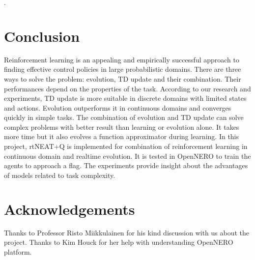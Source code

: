 \documentclass[letterpaper]{article}
\begin{document}
. 

\section{Conclusion}
Reinforcement learning is an appealing and empirically successful approach to finding effective
control policies in large probabilistic domains. There are three ways to solve the problem: evolution, TD update and their combination. Their performances depend on the properties of the task. According to our research and experiments, TD update is more suitable in discrete domains with limited states and actions. Evolution outperforms it in continuous domains and converges quickly in simple tasks. The combination of evolution and TD update can solve complex problems with better result than learning or evolution alone. It takes more time but it also evolves a function approximator during learning. In this project, rtNEAT+Q is implemented for combination of reinforcement learning in continuous domain and realtime evolution. It is tested in OpenNERO to train the agents to approach a flag. The experiments provide insight about the advantages of models related to task complexity.

\section*{Acknowledgements}
Thanks to Professor Risto Miikkulainen for his kind discussion with us about the project. Thanks to Kim Houck for her help with understanding OpenNERO platform.



\end{document}
